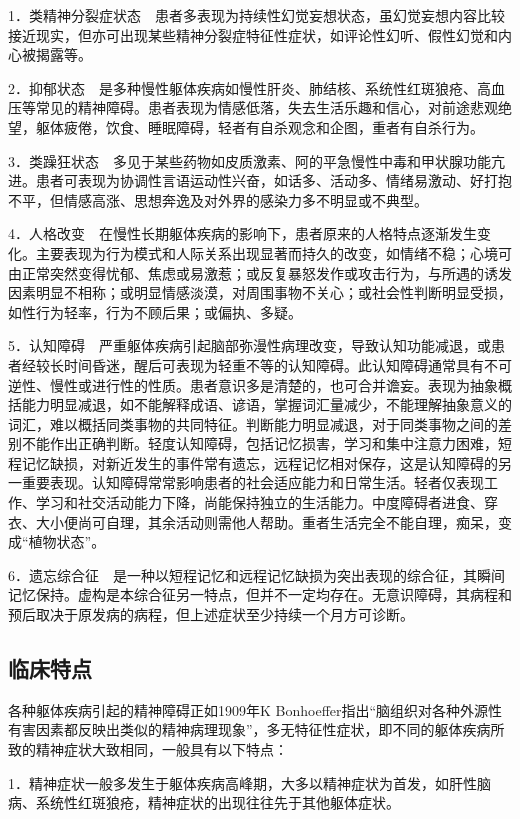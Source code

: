 1．类精神分裂症状态　患者多表现为持续性幻觉妄想状态，虽幻觉妄想内容比较接近现实，但亦可出现某些精神分裂症特征性症状，如评论性幻听、假性幻觉和内心被揭露等。

2．抑郁状态　是多种慢性躯体疾病如慢性肝炎、肺结核、系统性红斑狼疮、高血压等常见的精神障碍。患者表现为情感低落，失去生活乐趣和信心，对前途悲观绝望，躯体疲倦，饮食、睡眠障碍，轻者有自杀观念和企图，重者有自杀行为。

3．类躁狂状态　多见于某些药物如皮质激素、阿的平急慢性中毒和甲状腺功能亢进。患者可表现为协调性言语运动性兴奋，如话多、活动多、情绪易激动、好打抱不平，但情感高涨、思想奔逸及对外界的感染力多不明显或不典型。

4．人格改变　在慢性长期躯体疾病的影响下，患者原来的人格特点逐渐发生变化。主要表现为行为模式和人际关系出现显著而持久的改变，如情绪不稳；心境可由正常突然变得忧郁、焦虑或易激惹；或反复暴怒发作或攻击行为，与所遇的诱发因素明显不相称；或明显情感淡漠，对周围事物不关心；或社会性判断明显受损，如性行为轻率，行为不顾后果；或偏执、多疑。

5．认知障碍　严重躯体疾病引起脑部弥漫性病理改变，导致认知功能减退，或患者经较长时间昏迷，醒后可表现为轻重不等的认知障碍。此认知障碍通常具有不可逆性、慢性或进行性的性质。患者意识多是清楚的，也可合并谵妄。表现为抽象概括能力明显减退，如不能解释成语、谚语，掌握词汇量减少，不能理解抽象意义的词汇，难以概括同类事物的共同特征。判断能力明显减退，对于同类事物之间的差别不能作出正确判断。轻度认知障碍，包括记忆损害，学习和集中注意力困难，短程记忆缺损，对新近发生的事件常有遗忘，远程记忆相对保存，这是认知障碍的另一重要表现。认知障碍常常影响患者的社会适应能力和日常生活。轻者仅表现工作、学习和社交活动能力下降，尚能保持独立的生活能力。中度障碍者进食、穿衣、大小便尚可自理，其余活动则需他人帮助。重者生活完全不能自理，痴呆，变成``植物状态''。

6．遗忘综合征　是一种以短程记忆和远程记忆缺损为突出表现的综合征，其瞬间记忆保持。虚构是本综合征另一特点，但并不一定均存在。无意识障碍，其病程和预后取决于原发病的病程，但上述症状至少持续一个月方可诊断。

\subsection{临床特点}

各种躯体疾病引起的精神障碍正如1909年K
Bonhoeffer指出``脑组织对各种外源性有害因素都反映出类似的精神病理现象''，多无特征性症状，即不同的躯体疾病所致的精神症状大致相同，一般具有以下特点：

1．精神症状一般多发生于躯体疾病高峰期，大多以精神症状为首发，如肝性脑病、系统性红斑狼疮，精神症状的出现往往先于其他躯体症状。

